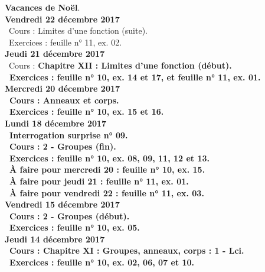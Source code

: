 \documentclass[12pt,a4paper]{article}
\begin{document}
\noindent\textbf{\bf Vacances de Noël}.\vspace{.4cm}\\

\noindent\textbf{Vendredi 22 décembre 2017}\\ 
\bu\ Cours : Limites d'une fonction (suite).\\
\bu\ Exercices : feuille n° 11, ex. 02.\vspace{.4cm}\\

\noindent\textbf{Jeudi 21 décembre 2017}\\
\bu\ Cours : \bf Chapitre XII \rm : Limites d'une fonction (début).\\
\bu\ Exercices : feuille n° 10, ex. 14 et 17, et feuille n° 11, ex. 01.\vspace{.4cm}\\

\noindent\textbf{\bf Mercredi 20 décembre 2017}\\
\bu\ Cours : Anneaux et corps.\\ 
\bu\ Exercices : feuille n° 10, ex. 15 et 16.\vspace{.4cm}\\

\noindent\textbf{Lundi 18 décembre 2017}\\
\bu\ Interrogation surprise n° 09.\\
\bu\ Cours : 2 - Groupes (fin).\\ 
\bu\ Exercices : feuille n° 10, ex. 08, 09, 11, 12 et 13.\\
\bu\ À faire pour mercredi 20 : feuille n° 10, ex. 15.\\
\bu\ À faire pour jeudi 21 : feuille n° 11, ex. 01.\\
\bu\ À faire pour vendredi 22 : feuille n° 11, ex. 03.\vspace{.4cm}\\

\noindent\textbf{Vendredi 15 décembre 2017}\\
\bu\ Cours : 2 - Groupes (début).\\ 
\bu\ Exercices : feuille n° 10, ex. 05.\vspace{.4cm}\\

\noindent\textbf{Jeudi 14 décembre 2017}\\
\bu\ Cours : \bf Chapitre XI \rm : Groupes, anneaux, corps  : 1 - Lci.\\
\bu\ Exercices : feuille n° 10, ex. 02, 06, 07 et 10.\vspace{.4cm}\\
\end{document}
